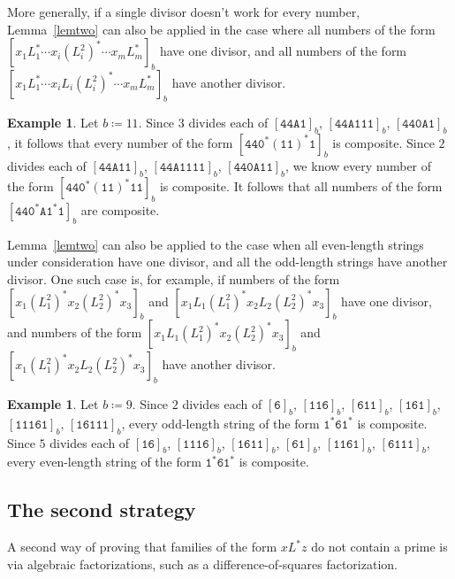 \documentclass[12pt]{article}
\theoremstyle{plain}
\theoremstyle{definition}
\newtheorem{example}[theorem]{Example}
\theoremstyle{remark}
\newcommand{\0}{\mathtt{0}}
\newcommand{\1}{\mathtt{1}}
\newcommand{\2}{\mathtt{2}}
\newcommand{\3}{\mathtt{3}}
\newcommand{\4}{\mathtt{4}}
\newcommand{\5}{\mathtt{5}}
\newcommand{\6}{\mathtt{6}}
\newcommand{\7}{\mathtt{7}}
\newcommand{\8}{\mathtt{8}}
\newcommand{\9}{\mathtt{9}}
\newcommand{\A}{\mathtt{A}}
\begin{document}
More generally, if a single divisor doesn't work for every number, 
Lemma~\ref{lemtwo} can also be applied in the case where all numbers 
of the form $[x_1L_1^*\dotsm x_i(L_i^2)^*\dotsm x_mL_m^*]_b$ have one
divisor, and all numbers of the form 
$[x_1L_1^*\dotsm x_iL_i(L_i^2)^*\dotsm x_mL_m^*]_b$ have another divisor.
\begin{example}
Let $b \coloneqq 11$.
Since $3$ divides each of $[\4\4\A\1]_b$,
$[\4\4\A\1\1\1]_b$,
$[\4\4\0\A\1]_b$ ,
it follows that
every number of the form $[\4\4\0^*(\1\1)^*\1]_b$ is composite.
Since $2$ divides each of $[\4\4\A\1\1]_b$,
$[\4\4\A\1\1\1\1]_b$, $[\4\4\0\A\1\1]_b$, we know
every number of the form $[\4\4\0^*(\1\1)^*\1\1]_b$ is composite.
It follows that all numbers of the form $[\4\4\0^*\A\1^*\1]_b$ are composite.
\end{example}

Lemma~\ref{lemtwo} can also be applied to the case when all even-length 
strings under consideration have one divisor, and all the odd-length 
strings have another divisor.  One such case is, for example,
if numbers of the form 
$[x_1(L_1^2)^*x_2(L_2^2)^*x_3]_b$ and $[x_1 L_1(L_1^2)^*x_2L_2(L_2^2)^*x_3]_b$ 
have one divisor, and numbers of the form $[x_1L_1(L_1^2)^*x_2(L_2^2)^*x_3]_b$ 
and $[x_1(L_1^2)^*x_2L_2(L_2^2)^*x_3]_b$ have another divisor.
\begin{example}
Let $b \coloneqq 9$.
Since $2$ divides each of $[\6]_b$,
$[\1\1\6]_b$,
$[\6\1\1]_b$,
$[\1\6\1]_b$,
$[\1\1\1\6\1]_b$, 
$[\1\6\1\1\1]_b$, every odd-length string of the form $\1^*\6\1^*$ is 
composite.
Since $5$ divides each of $[\1\6]_b$,
$[\1\1\1\6]_b$,
$[\1\6\1\1]_b$,
$[\6\1]_b$,
$[\1\1\6\1]_b$, 
$[\6\1\1\1]_b$,
every even-length string of the form $\1^*\6\1^*$ is composite.
\end{example}

\subsection{The second strategy}

A second way of proving that families of the form $xL^*z$ do not contain a 
prime is via algebraic factorizations, such as a difference-of-squares 
factorization.
\end{document}

